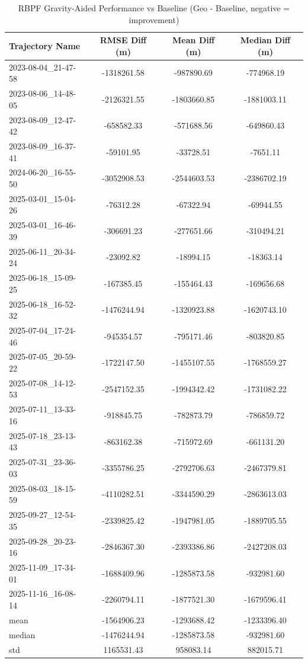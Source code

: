 \begin{table}[h]
    \centering
    \caption{RBPF Gravity-Aided Performance vs Baseline (Geo - Baseline, negative = improvement)}
    \begin{tabular}{ || l  ||ccc|| }
    \toprule
   Trajectory Name & RMSE Diff (m) & Mean Diff (m) & Median Diff (m) \\
        \midrule
        2023-08-04\_21-47-58 & -1318261.58 & -987890.69 & -774968.19 \\
        2023-08-06\_14-48-05 & -2126321.55 & -1803660.85 & -1881003.11 \\
        2023-08-09\_12-47-42 & -658582.33 & -571688.56 & -649860.43 \\
        2023-08-09\_16-37-41 & -59101.95 & -33728.51 & -7651.11 \\
        2024-06-20\_16-55-50 & -3052908.53 & -2544603.53 & -2386702.19 \\
        2025-03-01\_15-04-26 & -76312.28 & -67322.94 & -69944.55 \\
        2025-03-01\_16-46-39 & -306691.23 & -277651.66 & -310494.21 \\
        2025-06-11\_20-34-24 & -23092.82 & -18994.15 & -18363.14 \\
        2025-06-18\_15-09-25 & -167385.45 & -155464.43 & -169656.68 \\
        2025-06-18\_16-52-32 & -1476244.94 & -1320923.88 & -1620743.10 \\
        2025-07-04\_17-24-46 & -945354.57 & -795171.46 & -803820.85 \\
        2025-07-05\_20-59-22 & -1722147.50 & -1455107.55 & -1768559.27 \\
        2025-07-08\_14-12-53 & -2547152.35 & -1994342.42 & -1731082.22 \\
        2025-07-11\_13-33-16 & -918845.75 & -782873.79 & -786859.72 \\
        2025-07-18\_23-13-43 & -863162.38 & -715972.69 & -661131.20 \\
        2025-07-31\_23-36-03 & -3355786.25 & -2792706.63 & -2467379.81 \\
        2025-08-03\_18-15-59 & -4110282.51 & -3344590.29 & -2863613.03 \\
        2025-09-27\_12-54-35 & -2339825.42 & -1947981.05 & -1889705.55 \\
        2025-09-28\_20-23-16 & -2846367.30 & -2393386.86 & -2427208.03 \\
        2025-11-09\_17-34-01 & -1688409.96 & -1285873.58 & -932981.60 \\
        2025-11-16\_16-08-14 & -2260794.11 & -1877521.30 & -1679596.41 \\
        \midrule
        mean & -1564906.23 & -1293688.42 & -1233396.40 \\
        median & -1476244.94 & -1285873.58 & -932981.60 \\
        std & 1165531.43 & 958083.14 & 882015.71 \\
        \bottomrule
    \end{tabular}
    \label{tab:rbpf_results}
\end{table}